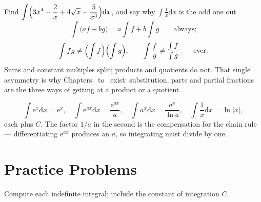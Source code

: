 \begin{worked}{Find $\displaystyle\int\Bigl(3x^{4}-\frac{2}{x}+4\sqrt{x}-\frac{5}{x^{3}}\Bigr)\mathrm{d}x$, and say why $\int\frac{1}{x}\mathrm{d}x$ is the odd one out}
\[
  \int\bigl(af+bg\bigr)=a\int f+b\int g
  \qquad\text{always;}
\]
\[
  \int fg\neq\Bigl(\int f\Bigr)\Bigl(\int g\Bigr),
  \qquad
  \int\frac fg\neq\frac{\int f}{\int g}
  \qquad\text{ever.}
\]
Sums and constant multiples split; products and quotients do not. That
single asymmetry is why Chapters~ to~ exist: substitution, parts and
partial fractions are the three ways of getting at a product or a quotient.

\[
  \int\mathrm{e}^{x}\mathrm{d}x=\mathrm{e}^{x},
  \quad
  \int\mathrm{e}^{ax}\mathrm{d}x=\frac{\mathrm{e}^{ax}}{a},
  \quad
  \int a^{x}\mathrm{d}x=\frac{a^{x}}{\ln a},
  \quad
  \int\frac{1}{x}\mathrm{d}x=\ln|x| ,
\]
each plus $C$. The factor $1/a$ in the second is the compensation for the
chain rule --- differentiating $\mathrm{e}^{ax}$ produces an $a$, so
integrating must divide by one.
\end{worked}

\section{Practice Problems}

Compute each indefinite integral; include the constant of integration $C$.

